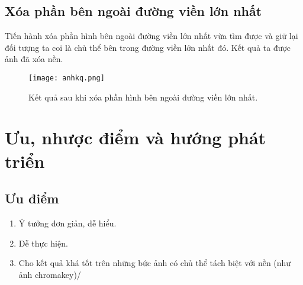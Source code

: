 \documentclass[conference]{IEEEtran}
\begin{document}
\subsection{Xóa phần bên ngoài đường viền lớn nhất}
Tiến hành xóa phần hình bên ngoài đường viền lớn nhất vừa tìm được và giữ lại đối tượng ta coi là chủ thể bên trong đường viền lớn nhất đó. Kết quả ta được ảnh đã xóa nền.
\begin{figure}[!htb]
\centerline{\texttt{[image: anhkq.png]}}
\caption{Kết quả sau khi xóa phần hình bên ngoài đường viền lớn nhất.}
\label{fig}
\end{figure}
 \FloatBarrier
 \section{Ưu, nhược điểm và hướng phát triển}
 \subsection{Ưu điểm}
 \begin{enumerate}
     \item Ý tưởng đơn giản, dễ hiểu.
     \item Dễ thực hiện.
     \item Cho kết quả khá tốt trên những bức ảnh có chủ thể tách biệt với nền (như ảnh chromakey)/
 \end{enumerate}
\end{document}
